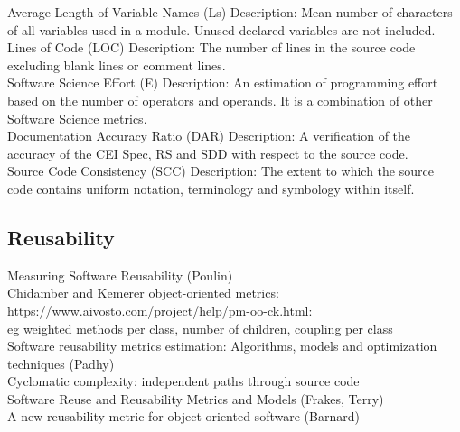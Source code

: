 \documentclass{article}
\begin{document}
 Average Length of Variable Names (Ls) Description:     Mean  number  of  characters  of  all  variables  used  in  a  module.    Unused  declared  variables are not included. \\
 
  Lines of  Code (LOC) Description: The number of lines in the source code excluding blank lines or comment lines.\\
  
  Software Science Effort (E) Description:    An  estimation  of  programming  effort  based  on  the  number  of  operators  and  operands.  It is a combination of other Software Science metrics.\\
  
  Documentation Accuracy Ratio (DAR) Description:     A  verification  of  the  accuracy  of  the  CEI Spec, RS and SDD with respect to the source code.\\
  
  Source Code Consistency (SCC) Description:     The  extent  to  which  the  source  code  contains uniform notation, terminology and symbology within itself. \\
  
  



\subsection{Reusability}
Measuring Software Reusability (Poulin)\\  

Chidamber and Kemerer object-oriented metrics:\\ 

https://www.aivosto.com/project/help/pm-oo-ck.html:\\ 

eg weighted methods per class, number of children, coupling per class\\ 

Software reusability metrics estimation: Algorithms, models and optimization techniques (Padhy)\\ 

Cyclomatic complexity: independent paths through source code\\ 

Software Reuse and Reusability Metrics and Models (Frakes, Terry)\\ 

A new reusability metric for object-oriented software (Barnard)\\ 
\end{document}

